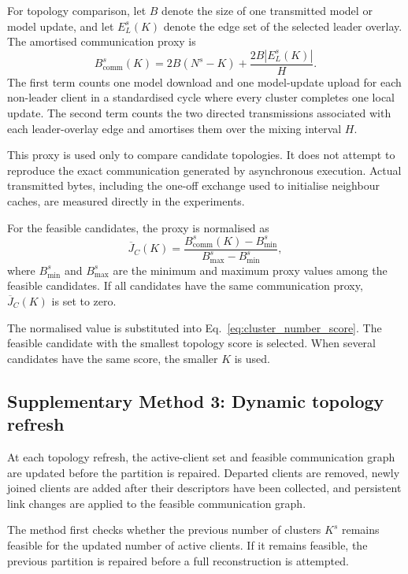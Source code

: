 \documentclass[pdflatex,sn-mathphys-num]{sn-jnl}
\begin{document}
For topology comparison, let \(B\) denote the size of one transmitted model or model update, and let \(E_L^s(K)\) denote the edge set of the selected leader overlay. The amortised communication proxy is
\begin{equation}
B_{\mathrm{comm}}^s(K)
=
2B(N^s-K)
+
\frac{2B|E_L^s(K)|}{H}.
\label{eq:supp_communication_proxy}
\end{equation}
The first term counts one model download and one model-update upload for each non-leader client in a standardised cycle where every cluster completes one local update. The second term counts the two directed transmissions associated with each leader-overlay edge and amortises them over the mixing interval \(H\).

This proxy is used only to compare candidate topologies. It does not attempt to reproduce the exact communication generated by asynchronous execution. Actual transmitted bytes, including the one-off exchange used to initialise neighbour caches, are measured directly in the experiments.

For the feasible candidates, the proxy is normalised as
\begin{equation}
\overline{J}_C(K)
=
\frac{
B_{\mathrm{comm}}^s(K)
-
B_{\min}^s
}{
B_{\max}^s
-
B_{\min}^s
},
\label{eq:supp_communication_normalisation}
\end{equation}
where \(B_{\min}^s\) and \(B_{\max}^s\) are the minimum and maximum proxy values among the feasible candidates. If all candidates have the same communication proxy, \(\overline{J}_C(K)\) is set to zero.

The normalised value is substituted into Eq.~\eqref{eq:cluster_number_score}. The feasible candidate with the smallest topology score is selected. When several candidates have the same score, the smaller \(K\) is used.


\subsection{Supplementary Method 3: Dynamic topology refresh}
\label{supp:dynamic_topology_refresh}

At each topology refresh, the active-client set and feasible communication graph are updated before the partition is repaired. Departed clients are removed, newly joined clients are added after their descriptors have been collected, and persistent link changes are applied to the feasible communication graph.

The method first checks whether the previous number of clusters \(K^s\) remains feasible for the updated number of active clients. If it remains feasible, the previous partition is repaired before a full reconstruction is attempted.
\end{document}
